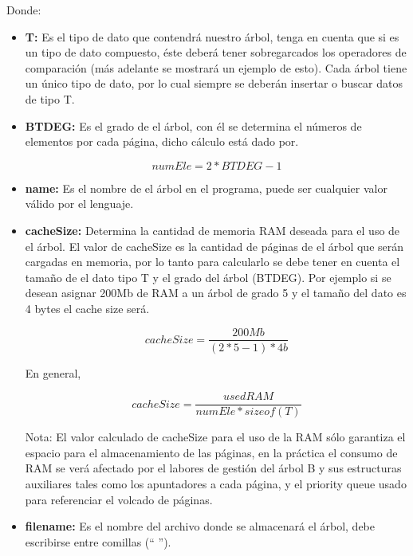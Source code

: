 \documentclass{book}
\begin{document}
\noindent Donde:\\
\begin{itemize}
\item {\bf T:} Es el tipo de dato que contendrá nuestro árbol, tenga en cuenta que si es un tipo de dato compuesto, éste deberá tener sobregarcados los operadores de comparación (más adelante se mostrará un ejemplo de esto). Cada árbol tiene un único tipo de dato, por lo cual siempre se deberán insertar o buscar datos de tipo T.\\

\item {\bf BTDEG:} Es el grado de el árbol, con él se determina el números de elementos por cada página, dicho cálculo está dado por.

\[numEle = 2*BTDEG -1 \]

\item {\bf name:} Es el nombre de el árbol en el programa, puede ser cualquier valor válido por el lenguaje.\\

\item {\bf cacheSize:} Determina la cantidad de memoria RAM deseada para el uso de el árbol. El valor de cacheSize es la cantidad de páginas de el árbol que serán cargadas en memoria, por lo tanto para calcularlo se debe tener en cuenta el tamaño de el dato tipo T y el grado del árbol (BTDEG). Por ejemplo si se desean asignar 200Mb de RAM a un árbol de grado 5 y el tamaño del dato es 4 bytes el cache size será.

\[cacheSize = \frac {200Mb}{(2*5 -1) * 4b} \]

En general,

\[cacheSize = \frac {usedRAM}{numEle * sizeof(T)} \]

Nota: El valor calculado de cacheSize para el uso de la RAM sólo garantiza el espacio para el almacenamiento de las páginas, en la práctica el consumo de RAM se verá afectado por el labores de gestión del árbol B y sus estructuras auxiliares tales como los apuntadores a cada página, y el priority queue usado para referenciar el volcado de páginas.

\item {\bf filename:} Es el nombre del archivo donde se almacenará el árbol, debe escribirse entre comillas (`` '').\\


\end{itemize}
\end{document}
